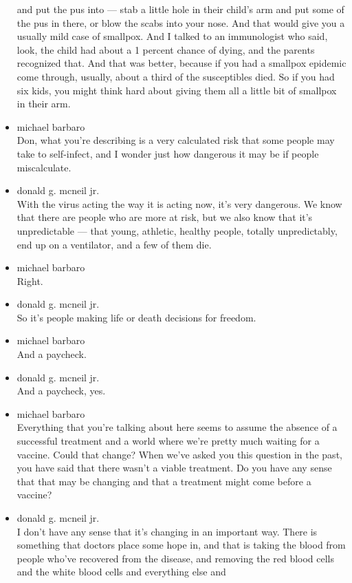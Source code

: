 \begin{itemize}
  and put the pus into --- stab a little hole in their child's arm and
  put some of the pus in there, or blow the scabs into your nose. And
  that would give you a usually mild case of smallpox. And I talked to
  an immunologist who said, look, the child had about a 1 percent chance
  of dying, and the parents recognized that. And that was better,
  because if you had a smallpox epidemic come through, usually, about a
  third of the susceptibles died. So if you had six kids, you might
  think hard about giving them all a little bit of smallpox in their
  arm.
\item
  michael barbaro\\
  Don, what you're describing is a very calculated risk that some people
  may take to self-infect, and I wonder just how dangerous it may be if
  people miscalculate.
\item
  donald g. mcneil jr.\\
  With the virus acting the way it is acting now, it's very dangerous.
  We know that there are people who are more at risk, but we also know
  that it's unpredictable --- that young, athletic, healthy people,
  totally unpredictably, end up on a ventilator, and a few of them die.
\item
  michael barbaro\\
  Right.
\item
  donald g. mcneil jr.\\
  So it's people making life or death decisions for freedom.
\item
  michael barbaro\\
  And a paycheck.
\item
  donald g. mcneil jr.\\
  And a paycheck, yes.
\item
  michael barbaro\\
  Everything that you're talking about here seems to assume the absence
  of a successful treatment and a world where we're pretty much waiting
  for a vaccine. Could that change? When we've asked you this question
  in the past, you have said that there wasn't a viable treatment. Do
  you have any sense that that may be changing and that a treatment
  might come before a vaccine?
\item
  donald g. mcneil jr.\\
  I don't have any sense that it's changing in an important way. There
  is something that doctors place some hope in, and that is taking the
  blood from people who've recovered from the disease, and removing the
  red blood cells and the white blood cells and everything else and

\end{itemize}
